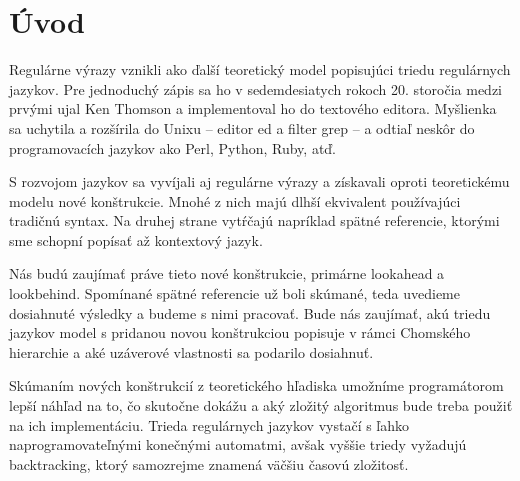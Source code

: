 {}
{}
\chapter*{Úvod}\label{chap:intro}

Regulárne výrazy vznikli ako ďalší teoretický model popisujúci triedu regulárnych jazykov. Pre jednoduchý zápis sa ho v sedemdesiatych rokoch 20. storočia medzi prvými ujal Ken Thomson a implementoval ho do textového editora. Myšlienka sa uchytila a rozšírila do Unixu -- editor ed a filter grep -- a odtiaľ neskôr do programovacích jazykov ako Perl, Python, Ruby, atď. \cite{Cox07SlowPython}

S rozvojom jazykov sa vyvíjali aj regulárne výrazy a získavali oproti teoretickému modelu nové konštrukcie. Mnohé z nich majú dlhší ekvivalent používajúci tradičnú syntax. Na druhej strane vytŕčajú napríklad spätné referencie, ktorými sme schopní popísať až kontextový jazyk.

Nás budú zaujímať práve tieto nové konštrukcie, primárne lookahead a lookbehind. Spomínané spätné referencie už boli skúmané, teda uvedieme dosiahnuté výsledky a budeme s nimi pracovať. Bude nás zaujímať, akú triedu jazykov model s pridanou novou konštrukciou popisuje v rámci Chomského hierarchie a aké uzáverové vlastnosti sa podarilo dosiahnuť.

Skúmaním nových konštrukcií z teoretického hľadiska umožníme programátorom lepší náhľad na to, čo skutočne dokážu a aký zložitý algoritmus bude treba použiť na ich implementáciu. Trieda regulárnych jazykov vystačí s ľahko naprogramovateľnými konečnými automatmi, avšak vyššie triedy vyžadujú backtracking, ktorý samozrejme znamená väčšiu časovú zložitosť.
